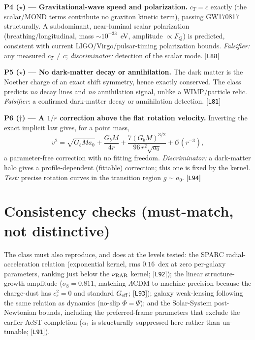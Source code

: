 \documentclass[11pt,letterpaper]{article}
\begin{document}
\textbf{P4 ($\star$) --- Gravitational-wave speed and polarization.}
$c_T=c$ exactly (the scalar/MOND terms contribute no graviton kinetic term), passing GW170817 structurally.
A subdominant, near-luminal scalar polarization (breathing/longitudinal, mass $\sim\!10^{-33}$~eV, amplitude
$\propto F_Q$) is predicted, consistent with current LIGO/Virgo/pulsar-timing polarization bounds.
\emph{Falsifier:} any measured $c_T\neq c$; \emph{discriminator:} detection of the scalar mode. [\texttt{L88}]

\textbf{P5 ($\star$) --- No dark-matter decay or annihilation.}
The dark matter is the Noether charge of an exact shift symmetry, hence exactly conserved. The class predicts
\emph{no} decay lines and \emph{no} annihilation signal, unlike a WIMP/particle relic.
\emph{Falsifier:} a confirmed dark-matter decay or annihilation detection. [\texttt{L81}]

\textbf{P6 ($\dagger$) --- A $1/r$ correction above the flat rotation velocity.}
Inverting the exact implicit law gives, for a point mass,
\[
v^2=\sqrt{G_bMa_0}+\frac{G_bM}{4r}+\frac{7(G_bM)^{3/2}}{96\,r^2\sqrt{a_0}}+\mathcal{O}(r^{-3}),
\]
a parameter-free correction with no fitting freedom. \emph{Discriminator:} a dark-matter halo gives a
profile-dependent (fittable) correction; this one is fixed by the kernel. \emph{Test:} precise rotation
curves in the transition region $g\sim a_0$. [\texttt{L94}]

\section{Consistency checks (must-match, not distinctive)}
The class must also reproduce, and does at the levels tested: the SPARC radial-acceleration relation
(exponential kernel, rms $0.16$~dex at zero per-galaxy parameters, ranking just below the $\nu_{\rm RAR}$
kernel; [\texttt{L92}]); the linear structure-growth amplitude ($\sigma_8=0.811$, matching $\Lambda$CDM to
machine precision because the charge-dust has $c_s^2=0$ and standard $G_{\rm eff}$; [\texttt{L93}]); galaxy
weak-lensing following the same relation as dynamics (no-slip $\Phi=\Psi$); and the Solar-System
post-Newtonian bounds, including the preferred-frame parameters that exclude the earlier AeST completion
($\alpha_1$ is structurally suppressed here rather than un-tunable; [\texttt{L91}]).
\end{document}
